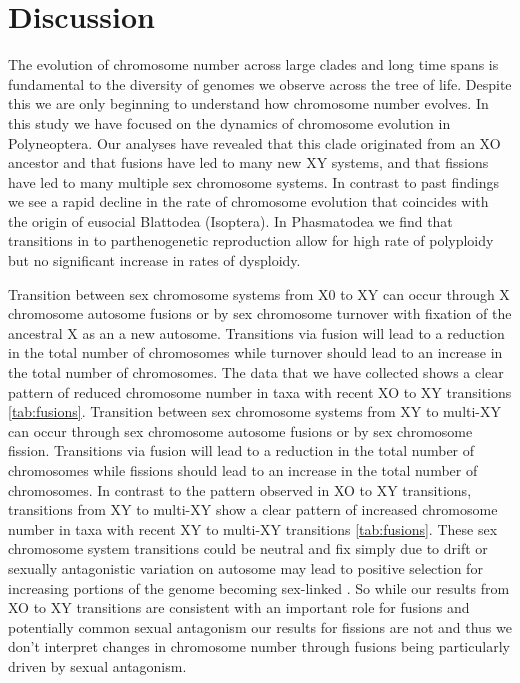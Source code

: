 \section{Discussion}
The evolution of chromosome number across large clades and long time spans is fundamental to the diversity of genomes we observe across the tree of life.
Despite this we are only beginning to understand how chromosome number evolves.
In this study we have focused on the dynamics of chromosome evolution in Polyneoptera. 
Our analyses have revealed that this clade originated from an XO ancestor and that fusions have led to many new XY systems, and that fissions have led to many multiple sex chromosome systems.
In contrast to past findings \citep{ross2015} we see a rapid decline in the rate of chromosome evolution that coincides with the origin of eusocial Blattodea (Isoptera).
In Phasmatodea we find that transitions in to parthenogenetic reproduction allow for high rate of polyploidy but no significant increase in rates of dysploidy.

Transition between sex chromosome systems from X0 to XY can occur through X chromosome autosome fusions or by sex chromosome turnover with fixation of the ancestral X as an a new autosome.
Transitions via fusion will lead to a reduction in the total number of chromosomes while turnover should lead to an increase in the total number of chromosomes.
The data that we have collected shows a clear pattern of reduced chromosome number in taxa with recent XO to XY transitions \ref{tab:fusions}.
Transition between sex chromosome systems from XY to multi-XY can occur through sex chromosome autosome fusions or by sex chromosome fission.
Transitions via fusion will lead to a reduction in the total number of chromosomes while fissions should lead to an increase in the total number of chromosomes.
In contrast to the pattern observed in XO to XY transitions, transitions from XY to multi-XY show a clear pattern of increased chromosome number in taxa with recent XY to multi-XY transitions \ref{tab:fusions}.
These sex chromosome system transitions could be neutral and fix simply due to drift or sexually antagonistic variation on autosome may lead to positive selection for increasing portions of the genome becoming sex-linked \citep{charlesworth1980, kitano2012}.
So while our results from XO to XY transitions are consistent with an important role for fusions and potentially common sexual antagonism our results for fissions are not and thus we don't interpret changes in chromosome number through fusions being particularly driven by sexual antagonism. 

